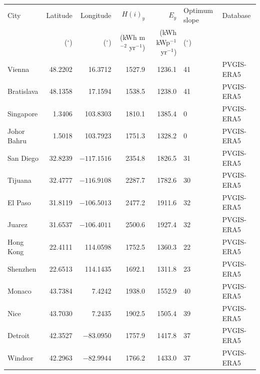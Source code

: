 \begin{tabular}{@{}lrrrrll@{}}
\toprule
City & Latitude & Longitude & $H(i)_y$ & $E_y$ & Optimum slope & Database \\
 & ($^\circ$) & ($^\circ$) & (kWh m$^{-2}$ yr$^{-1}$) & (kWh kWp$^{-1}$ yr$^{-1}$) & ($^\circ$) & \\
\midrule
Vienna & 48.2202 & 16.3712 & 1527.9 & 1236.1 & 41 & PVGIS-ERA5 \\
Bratislava & 48.1358 & 17.1594 & 1538.5 & 1238.0 & 41 & PVGIS-ERA5 \\
Singapore & 1.3406 & 103.8303 & 1810.1 & 1385.4 & 0 & PVGIS-ERA5 \\
Johor Bahru & 1.5018 & 103.7923 & 1751.3 & 1328.2 & 0 & PVGIS-ERA5 \\
San Diego & 32.8239 & $-117.1516$ & 2354.8 & 1826.5 & 31 & PVGIS-ERA5 \\
Tijuana & 32.4777 & $-116.9108$ & 2287.7 & 1782.6 & 30 & PVGIS-ERA5 \\
El Paso & 31.8119 & $-106.5013$ & 2477.2 & 1911.6 & 32 & PVGIS-ERA5 \\
Juarez & 31.6537 & $-106.4011$ & 2500.6 & 1927.4 & 32 & PVGIS-ERA5 \\
Hong Kong & 22.4111 & 114.0598 & 1752.5 & 1360.3 & 22 & PVGIS-ERA5 \\
Shenzhen & 22.6513 & 114.1435 & 1692.1 & 1311.8 & 23 & PVGIS-ERA5 \\
Monaco & 43.7384 & 7.4242 & 1938.0 & 1552.9 & 40 & PVGIS-ERA5 \\
Nice & 43.7030 & 7.2435 & 1902.5 & 1505.4 & 39 & PVGIS-ERA5 \\
Detroit & 42.3527 & $-83.0950$ & 1757.9 & 1417.8 & 37 & PVGIS-ERA5 \\
Windsor & 42.2963 & $-82.9944$ & 1766.2 & 1433.0 & 37 & PVGIS-ERA5 \\
\bottomrule
\end{tabular}
